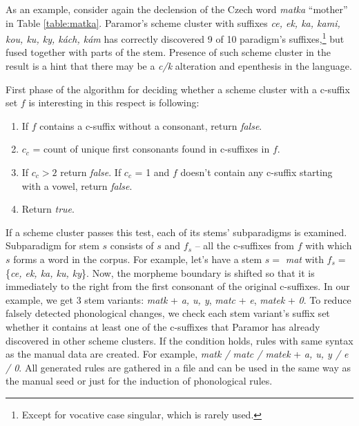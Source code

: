 \documentclass{itatnew}
\newcommand{\gloss}[2]{\emph{#1} ``#2''}
\newcommand{\e}[1]{\textit{#1}} %
\begin{document}
As an example, consider again the declension of the Czech word \gloss{matka}{mother} in Table \ref{table:matka}. Paramor's scheme cluster with suffixes \emph{ce, ek, ka, kami, kou, ku, ky, kách, kám} has correctly discovered 9 of 10 paradigm's suffixes,\footnote{Except for vocative case singular, which is rarely used.} but fused together with parts of the stem.
Presence of such scheme cluster in the result is a hint that there may be a \e{c/k} alteration and epenthesis in the language.

First phase of the algorithm for deciding whether a scheme cluster with a c-suffix set $f$ is interesting in this respect is following:
\begin{enumerate}
\item If $f$ contains a c-suffix without a consonant, return \emph{false}.
\item $c_c$ = count of unique first consonants found in c-suffixes in $f$.
\item If $c_c > 2$ return \emph{false}. If $c_c$ = 1 and $f$ doesn't contain any c-suffix starting with a vowel, return \emph{false}.
\item Return \emph{true}.
\end{enumerate}
If a scheme cluster passes this test, each of its stems' subparadigms is examined. Subparadigm for stem $s$ consists of $s$ and $f_s$ -- all the c-suffixes from $f$ with which $s$ forms a word in the corpus. For example, let's have a stem $s = $ \emph{mat} with $f_s = $ \{\emph{ce, ek, ka, ku, ky}\}. Now, the morpheme boundary is shifted so that it is immediately to the right from the first consonant of the original c-suffixes. In our example, we get 3 stem variants: \emph{matk} + \emph{a, u, y}, \emph{matc} + \emph{e}, \emph{matek} + \emph{0}. To reduce falsely detected phonological changes, we check each stem variant's suffix set whether it contains at least one of the c-suffixes that Paramor has already discovered in other scheme clusters. If the condition holds, rules with same syntax as the manual data are created. For example, \emph{matk / matc / matek} + \emph{a, u, y / e / 0}. All generated rules are gathered in a file and can be used in the same way as the manual seed or just for the induction of phonological rules.
\end{document}
